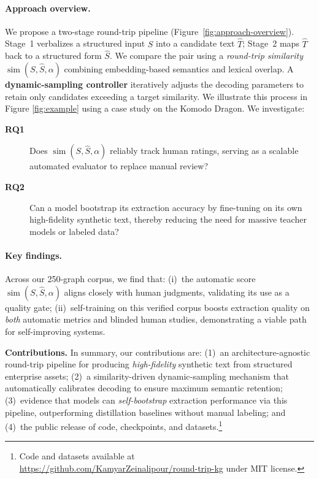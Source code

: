 \documentclass[11pt]{article}
\begin{document}
\paragraph{Approach overview.}
We propose a two-stage round-trip pipeline (Figure~\ref{fig:approach-overview}). Stage~1 verbalizes a structured input $S$ into a candidate text $\hat T$; Stage~2 maps $\hat T$ back to a structured form $\hat S$. We compare the pair using a \emph{round-trip similarity} $\operatorname{sim}(S,\hat S, \alpha)$ combining embedding-based semantics and lexical overlap. A \textbf{dynamic-sampling controller} iteratively adjusts the decoding parameters to retain only candidates exceeding a target similarity. We illustrate this process in Figure \ref{fig:example} using a case study on the Komodo Dragon.
We investigate:
\begin{description}
\item[\textbf{RQ1}] Does $\operatorname{sim}(S,\hat S, \alpha)$ reliably track human ratings, serving as a scalable automated evaluator to replace manual review?
\item[\textbf{RQ2}] Can a model bootstrap its extraction accuracy by fine-tuning on its own high-fidelity synthetic text, thereby reducing the need for massive teacher models or labeled data?

\end{description}
\paragraph{Key findings.}
Across our 250-graph corpus, we find that:
(i)~the automatic score $\operatorname{sim}(S,\hat S, \alpha)$ aligns closely with human judgments, validating its use as a quality gate;
(ii)~self-training on this verified corpus boosts extraction quality on \emph{both} automatic metrics and blinded human studies, demonstrating a viable path for self-improving systems. 

\noindent \textbf{Contributions.} In summary, our contributions are:
(1)~an architecture-agnostic round-trip pipeline for producing \emph{high-fidelity} synthetic text from structured enterprise assets;
(2)~a similarity-driven dynamic-sampling mechanism that automatically calibrates decoding to ensure maximum semantic retention;
(3)~evidence that models can \emph{self-bootstrap} extraction performance via this pipeline, outperforming distillation baselines without manual labeling; and
(4)~the public release of code, checkpoints, and datasets.\footnote{Code and datasets available at \url{https://github.com/KamyarZeinalipour/round-trip-kg} under MIT license.}
\end{document}
